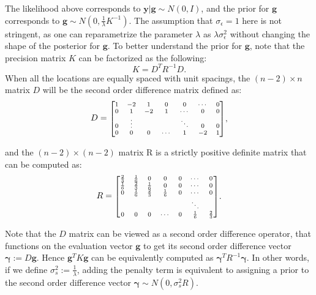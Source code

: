 \documentclass{article}
\begin{document}
The likelihood above corresponds to $\boldsymbol{y}|\boldsymbol{g} \sim N(0, I)$, and the prior for $\boldsymbol{g}$ corresponds to $\boldsymbol{g} \sim N(0, \frac{1}{\lambda} K^{-1})$. The assumption that $\sigma_\epsilon = 1$ here is not stringent, as one can reparametrize the parameter $\lambda$ as $\lambda\sigma_\epsilon^2$ without changing the shape of the posterior for $\boldsymbol{g}$.
To better understand the prior for $\boldsymbol{g}$, note that the precision matrix $K$ can be factorized as the following:
\begin{equation}\label{equ:ArimaPrior}
K = D^T R^{-1} D.
\end{equation}
When all the locations are equally spaced with unit spacings, the $(n-2) \times n$ matrix $D$ will be the second order difference matrix defined as:
\begin{equation}
\begin{aligned}
D = \mbox{\scriptsize $\begin{bmatrix}
1 & -2 & 1 & 0 & 0 & \cdots & 0\\
0 & 1 & -2 & 1 & \cdots & 0 & 0\\
0 & \vdots &  &  & \ddots & 0 & 0\\
0 & 0 & 0 & \cdots & 1 & -2 & 1\\
\end{bmatrix}$}
\end{aligned},
\end{equation}

and the $(n-2) \times (n-2)$ matrix R is a strictly positive definite matrix that can be computed as:
\begin{equation}
\begin{aligned}
R = \mbox{\scriptsize $\begin{bmatrix}
\frac{2}{3} & \frac{1}{6} & 0 & 0 & 0 & \cdots & 0\\
\frac{1}{6} & \frac{2}{3} & \frac{1}{6} & 0 & 0 & \cdots & 0\\
0 & \frac{1}{6} & \frac{2}{3} & \frac{1}{6} & 0 & \cdots & 0\\
 &  &  &  &  & \ddots & \\
0 & 0 & 0 & \cdots & 0 & \frac{1}{6} & \frac{2}{3}\\
\end{bmatrix}$}
\end{aligned}.
\end{equation}

Note that the $D$ matrix can be viewed as a second order difference operator, that functions on the evaluation vector $\textbf{g}$ to get its second order difference vector $\boldsymbol \gamma := D \boldsymbol g$. Hence $\boldsymbol g^TK \boldsymbol g$ can be equivalently computed as $\boldsymbol \gamma^T R^{-1} \boldsymbol \gamma$. In other words, if we define $\sigma_s^2 := \frac{1}{\lambda}$, adding the penalty term is equivalent to assigning a prior to the second order difference vector $\boldsymbol \gamma \sim N(0,\sigma_s^2R)$.
\end{document}

